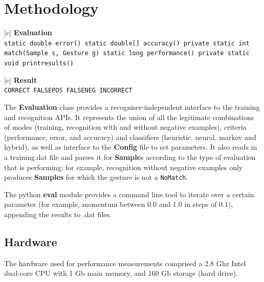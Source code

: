 \documentclass[12pt,a4,notitlepage]{report}
\renewcommand{\_}{\texttt{\symbol{95}}}
\newcommand{\<}{\texttt{\symbol{60}}}
\renewcommand{\>}{\texttt{\symbol{62}}}
\newcommand{\class}[1]{\textbf{#1}}
\newcommand{\variable}[1]{\texttt{#1}}
\begin{document}
\section{Methodology}

\begin{tabular}{|c|} \hline 
\class{Evaluation} \\ \hline
{}
{\variable{static double error() \newline
static double[] accuracy() \newline
private static int match(Sample s, Gesture g) \newline
static long performance() \newline
private static void print\_results()
} } \\ \hline
\end{tabular}

\begin{tabular}{|c|} \hline 
\class{Result} \\ \hline
{}
{\variable{CORRECT \newline
FALSE\_POS \newline
FALSE\_NEG \newline
INCORRECT
} } \\ \hline
\end{tabular}

The \class{Evaluation} class provides a recogniser-independent interface to the training and recognition APIs. It represents the union of all the legitimate combinations of modes (training, recognition with and without negative examples), criteria (performance, error, and accuracy) and classifiers (heuristic, neural, markov and hybrid), as well as interface to the \class{Config} file to set parameters. It also reads in a training.dat file and parses it for \class{Sample}s according to the type of evaluation that is performing; for example, recognition without negative examples only produces \class{Samples} for which the gesture is not a \variable{NoMatch}.

The python \class{eval} module provides a command line tool to iterate over a certain parameter (for example, momentum between 0.0 and 1.0 in steps of 0.1), appending the results to .dat files.

\subsection{Hardware}

The hardware used for performance measurements comprised a 2.8 Ghz Intel
dual-core CPU with 1 Gb main memory, and 160 Gb storage (hard drive).
\end{document}
